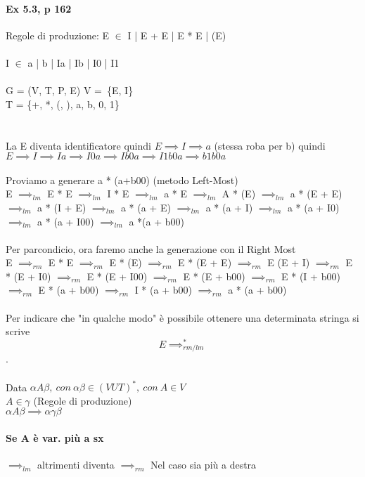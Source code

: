 \documentclass[12pt, a4paper, openany, oneside]{book}
\begin{document}
\paragraph{Ex 5.3, p 162}
Regole di produzione:
E $\in$ I | E + E | E * E | (E) \\ \\
I $\in$ a | b | Ia | Ib | I0 | I1 \\ \\
G = (V, T, P, E)      V = \{E, I\} \\
T = \{+, *, (, ), a, b, 0, 1\} \\ \\ \\
La E diventa identificatore quindi $E \implies I \implies a$ (stessa roba per b)
quindi $E \implies I \implies Ia \implies I0a \implies Ib0a \implies I1b0a 
\implies b1b0a$ 
\\ \\
Proviamo a generare a * (a+b00) (metodo Left-Most) \\
E $\implies _{lm}$ E * E $\implies _{lm}$ I * E $\implies _{lm}$ a * E
$\implies _{lm}$ A * (E) $\implies _{lm}$ a * (E + E) $\implies _{lm}$ a * 
(I + E) $\implies _{lm}$ a * (a + E) $\implies _{lm}$ a * (a + I) $\implies _{lm}$
a * (a + I0) $\implies _{lm}$ a * (a + I00) $\implies _{lm}$ a *(a + b00) \\ \\
Per parcondicio, ora faremo anche la generazione con il Right Most \\
E $\implies _{rm}$ E * E $\implies _{rm}$ E * (E) $\implies _{rm}$ E * (E + E)
$\implies _{rm}$ E (E + I) $\implies _{rm}$ E * (E + I0) $\implies _{rm}$ 
E * (E + I00) $\implies _{rm}$ E * (E + b00) $\implies _{rm}$ E * (I + b00)
$\implies _{rm}$ E * (a + b00) $\implies _{rm}$ I * (a + b00) $\implies _{rm}$ 
a * (a + b00) \\ \\
Per indicare che "in qualche modo" è possibile ottenere una determinata stringa
si scrive $$E \implies _{rm/lm}^{*}$$.
\\ \\ 
Data $\alpha A \beta, ~con~ \alpha \beta \in (V U T)^{*}, ~con~ A\in V$ \\
$A \in \gamma$ (Regole di produzione) \\
$\alpha A \beta \implies \alpha \gamma \beta$ 
\paragraph{Se A è var. più a sx} $\implies _{lm}$ altrimenti diventa 
$\implies _{rm}$ Nel caso sia più a destra
\\ \\
\end{document}

